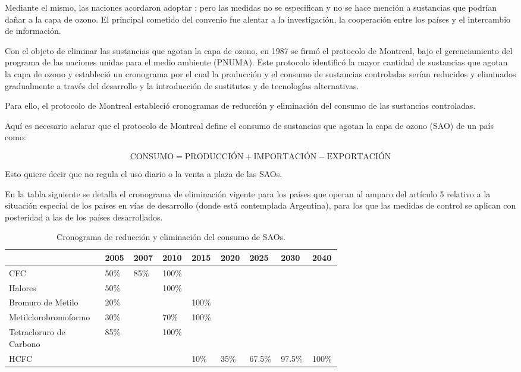 	Mediante el mismo, las naciones acordaron adoptar ; pero las medidas no se especifican y no se hace mención a sustancias que podrían dañar a la capa de ozono.	El principal cometido del convenio fue alentar a la investigación, la cooperación entre los países y el intercambio de información.

	Con el objeto de eliminar las sustancias que agotan la capa de ozono, en 1987 se firmó el protocolo de Montreal, bajo el gerenciamiento del programa de las naciones unidas para el medio ambiente (PNUMA). Este protocolo identificó la mayor cantidad de sustancias que agotan la capa de ozono y estableció un cronograma por el cual la producción y el consumo de sustancias controladas serían reducidos y eliminados gradualmente a través del desarrollo y la introducción de sustitutos y de tecnologías alternativas.

	Para ello, el protocolo de Montreal estableció cronogramas de reducción y eliminación del consumo de las sustancias controladas.

	Aquí es necesario aclarar que el protocolo de Montreal define el consumo de sustancias que agotan la capa de ozono (SAO) de un país como:

	\begin{equation}\nonumber
		\text{CONSUMO} = \text{PRODUCCIÓN} + \text{IMPORTACIÓN} - \text{EXPORTACIÓN} 
	\end{equation}

	Esto quiere decir que no regula el uso diario o la venta a plaza de las SAOs.

	En la tabla siguiente se detalla el cronograma de eliminación vigente para los países que operan al amparo del artículo 5 relativo a la situación especial de los países en vías de desarrollo (donde está contemplada Argentina), para los que las medidas de control se aplican con posteridad a las de los países desarrollados.

	\begin{table}[H]
		\footnotesize
		\centering
		\caption{Cronograma de reducción y eliminación del consumo de SAOs.}
		\begin{tabular}{M{0.25\linewidth} C{0.05\linewidth} C{0.05\linewidth} C{0.05\linewidth} C{0.05\linewidth} C{0.05\linewidth} C{0.05\linewidth} C{0.05\linewidth} C{0.05\linewidth} }
			 & 2005 & 2007 & 2010 & 2015 & 2020 & 2025 & 2030 & 2040 \\
			\hline
			CFC &  50\% & 85\% & 100\% \\
			Halores &  50\% & &  100\% \\
			Bromuro de Metilo & 20\% &  & & 100\% \\
			Metilclorobromoformo & 30\% & & 70\% & 100\% \\
			Tetracloruro de Carbono  &  85\% &  & 100\% \\
			HCFC & & & & 10\% & 35\% & 67.5\% & 97.5\% & 100\% \\
			\hline
		\end{tabular}
	\end{table}


